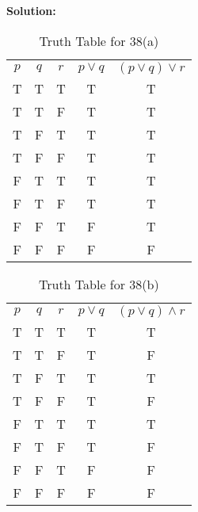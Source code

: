 \documentclass{Axon}
\begin{document}
\noindent
\textbf{Solution:}
\begin{table}[ht]
    \centering
    \begin{tabular}{c|c|c|c|c}
        \(p\) & \(q\) & \(r\) & \(p \lor q\) & \((p \lor q) \lor r\) \\
        T     & T     & T     & T            & T                     \\
        T     & T     & F     & T            & T                     \\
        T     & F     & T     & T            & T                     \\
        T     & F     & F     & T            & T                     \\
        F     & T     & T     & T            & T                     \\
        F     & T     & F     & T            & T                     \\
        F     & F     & T     & F            & T                     \\
        F     & F     & F     & F            & F                    
    \end{tabular}
    \caption{Truth Table for 38(a)}
\end{table}

\begin{table}[ht]
    \centering
    \begin{tabular}{c|c|c|c|c}
        \(p\) & \(q\) & \(r\) & \(p \lor q\) & \((p \lor q) \land r\) \\
        T     & T     & T     & T            & T                      \\
        T     & T     & F     & T            & F                      \\
        T     & F     & T     & T            & T                      \\
        T     & F     & F     & T            & F                      \\
        F     & T     & T     & T            & T                      \\
        F     & T     & F     & T            & F                      \\
        F     & F     & T     & F            & F                      \\
        F     & F     & F     & F            & F                     
    \end{tabular}
    \caption{Truth Table for 38(b)}
\end{table}
\end{document}
